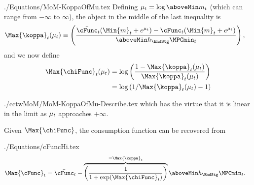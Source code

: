\documentclass[SolvingMicroDSOPs]{subfiles}
\begin{document}
\begin{verbatimwrite}{./Equations/MoM-KoppaOfMu.tex}
  Defining $\mu_{\prd} =
  \log \aboveMin \mNrm_{\prd}$ (which can range from $-\infty$ to $\infty$), the object in the middle of the last inequality is
  \begin{equation}\begin{gathered}\begin{aligned}
        \Max{\koppa}_{\prd}(\mu_{\prd})   & \equiv  \left(\frac{\bar{\cFunc}_{\prd}(\Min{m}_{\prd}+e^{\mu_{\prd}})-\cFunc_{\prd}(\Min{m}_{\prd}+e^{\mu_{\prd}})}{\aboveMin \hNrm_{\EndStg} \MPCmin_{\prd}}\right), \label{eq:koppa}
      \end{aligned}\end{gathered}\end{equation}
  and we now define
  \begin{equation}\begin{gathered}\begin{aligned}
        \Max{\chiFunc}_{\prd}(\mu_{\prd})  & = \log \left(\frac{1-\Max{\koppa}_{\prd}(\mu_{\prd})}{\Max{\koppa}_{\prd}(\mu_{\prd})}\right)
        \\  & = \log \left(1/\Max{\koppa}_{\prd}(\mu_{\prd})-1\right) \label{eq:chi}
      \end{aligned}\end{gathered}\end{equation}
\end{verbatimwrite}
\unskip
\begin{verbatimwrite}{./cctwMoM/MoM-KoppaOfMu-Describe.tex}
  which has the virtue that it is linear in the limit as $\mu_{t}$ approaches $+\infty$.

  Given $\Max{\chiFunc}$, the consumption function can be recovered from
\end{verbatimwrite}
\unskip
\begin{verbatimwrite}{./Equations/cFuncHi.tex}
  \begin{equation}\begin{gathered}\begin{aligned}
        \Max{\cFunc}_{\prd}  & = \bar{\cFunc}_{\prd}-\overbrace{\left(\frac{1}{1+\exp(\Max{\chiFunc}_{\prd})}\right)}^{=\Max{\koppa}_{\prd}} \aboveMin \hNrm_{\EndStg} \MPCmin_{\prd}. \label{eq:cFuncHi}
      \end{aligned}\end{gathered}\end{equation}
\end{verbatimwrite}
\unskip
\end{document}
